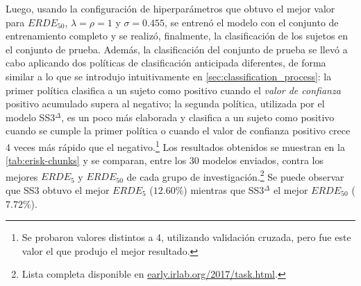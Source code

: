 
Luego, usando la configuración de hiperparámetros que obtuvo el mejor valor para $ERDE_{50}$, $\lambda = \rho = 1$ y $\sigma = 0.455$, se entrenó el  modelo con el conjunto de entrenamiento completo y se realizó, finalmente, la clasificación de los sujetos en el conjunto de prueba.
Además, la clasificación del conjunto de prueba se llevó a cabo aplicando dos políticas de clasificación anticipada diferentes, de forma similar a lo que se introdujo intuitivamente en \autoref{sec:classification_process}:
la primer política clasifica a un sujeto como positivo cuando el \emph{valor de confianza} positivo acumulado supera al negativo;
la segunda política, utilizada por el modelo SS3$^\Delta$, es un poco más elaborada y clasifica a un sujeto como positivo cuando se cumple la primer política o cuando el valor de confianza positivo crece 4 veces más rápido que el negativo.\footnote{Se probaron valores distintos a 4, utilizando validación cruzada, pero fue este valor el que produjo el mejor resultado.}
Los resultados obtenidos se muestran en la \autoref{tab:erisk-chunks} y se comparan, entre los 30 modelos enviados, contra los mejores $ERDE_5$ y $ERDE_{50}$ de cada grupo de investigación.\footnote{Lista completa disponible en \href{http://early.irlab.org/2017/task.html}{early.irlab.org/2017/task.html}.}
Se puede observar que SS3 obtuvo el mejor $ERDE_5$ ($12.60\%$) mientras que SS3$^\Delta$ el mejor $ERDE_{50}$ ($7.72\%$).

